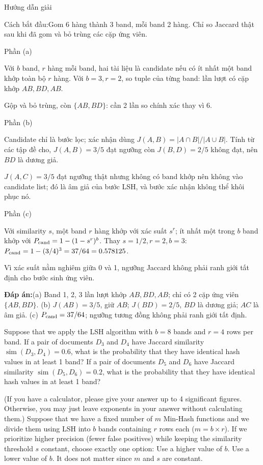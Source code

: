 \documentclass[10pt,a4paper,twocolumn]{article}
\makeatletter
\newcommand{\maptag}[1]{\phantomsection\@bsphack\protected@write\@auxout{}{\string\newlabel{#1}{{}{\thepage}{}{\@currentHref}{}}}\@esphack}
\newcommand{\key}[1]{#1:\enspace}
\newcommand{\solutionprompt}[1]{\par\addvspace{1pt}\noindent\key{Cách bắt đầu}#1\par\addvspace{2pt}}
\newcommand{\blocklabel}[1]{\par\noindent#1\par\nobreak}
\newcommand{\answer}[1]{%
  \par\addvspace{3pt}%
  \blocklabel{#1Hướng dẫn giải}}
\newcommand{\finalanswer}[1]{%
  \par\addvspace{3pt}\noindent\textbf{Đáp án:}\nobreak\enspace#1\par}
\newcommand{\guidepart}[1]{%
  \par\addvspace{1.5pt}%
  \blocklabel{Phần #1}}
\makeatother
\begin{document}
\answer{\maptag{answer:Pr5}}
\solutionprompt{Gom 6 hàng thành 3 band, mỗi band 2 hàng. Chỉ so Jaccard thật sau khi đã gom và bỏ trùng các cặp ứng viên.}
\guidepart{(a)}
\begin{guidesteps}
\item Với $b$ band, $r$ hàng mỗi band, hai tài liệu là candidate nếu có ít nhất một band khớp toàn bộ $r$ hàng. Với $b=3,r=2$, so tuple của từng band: lần lượt có cặp khớp $AB,BD,AB$.
\item Gộp và bỏ trùng, còn $\{AB,BD\}$: cần 2 lần so chính xác thay vì 6.
\end{guidesteps}
\guidepart{(b)}
\begin{guidesteps}
\item Candidate chỉ là bước lọc; xác nhận dùng $J(A,B)=|A\cap B|/|A\cup B|$. Tính từ các tập đề cho, $J(A,B)=3/5$ đạt ngưỡng còn $J(B,D)=2/5$ không đạt, nên $BD$ là dương giả.
\item $J(A,C)=3/5$ đạt ngưỡng thật nhưng không có band khớp nên không vào candidate list; đó là âm giả của bước LSH, và bước xác nhận không thể khôi phục nó.
\end{guidesteps}
\guidepart{(c)}
\begin{guidesteps}
\item Với similarity $s$, một band $r$ hàng khớp với xác suất $s^r$; ít nhất một trong $b$ band khớp với $P_{\rm cand}=1-(1-s^r)^b$. Thay $s=1/2,r=2,b=3$: $P_{\rm cand}=1-(3/4)^3=37/64=0.578125$.
\item Vì xác suất nằm nghiêm giữa 0 và 1, ngưỡng Jaccard không phải ranh giới tất định cho bước sinh ứng viên.
\end{guidesteps}
\finalanswer{(a) Band 1, 2, 3 lần lượt khớp $AB,BD,AB$; chỉ có 2 cặp ứng viên $\{AB,BD\}$. (b) $J(AB)=3/5$, giữ $AB$; $J(BD)=2/5$, $BD$ là dương giả; $AC$ là âm giả. (c) $P_{\rm cand}=37/64$; ngưỡng tương đồng không phải ranh giới tất định.}

 Suppose that we apply the LSH algorithm with $b=8$ bands and $r=4$ rows per band.
 If a pair of documents $D_3$ and $D_4$ have Jaccard similarity $\operatorname{sim}(D_3,D_4)=0.6$, what is the probability that they have identical hash values in at least 1 band?
 If a pair of documents $D_5$ and $D_6$ have Jaccard similarity $\operatorname{sim}(D_5,D_6)=0.2$, what is the probability that they have identical hash values in at least 1 band?

(If you have a calculator, please give your answer up to 4 significant figures. Otherwise, you may just leave exponents in your answer without calculating them.)
 Suppose that we have a fixed number of $m$ Min-Hash functions and we divide them using LSH into $b$ bands containing $r$ rows each ($m=b\times r$). If we prioritize higher precision (fewer false positives) while keeping the similarity threshold $s$ constant, choose exactly one option:
 Use a higher value of $b$.
 Use a lower value of $b$.
 It does not matter since $m$ and $s$ are constant.
\end{document}
